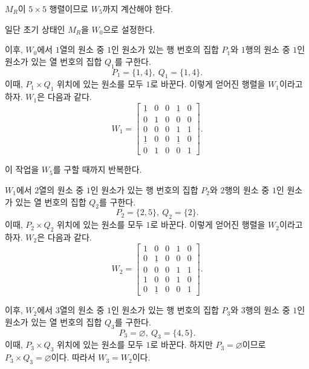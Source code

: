 \documentclass{oblivoir}
\begin{document}
$M_R$이 $5 \times 5$ 행렬이므로 $W_5$까지 계산해야 한다.

일단 초기 상태인 $M_R$을 $W_0$으로 설정한다.

이후, $W_0$에서 $1$열의 원소 중 $1$인 원소가 있는 행 번호의 집합 $P_1$와
$1$행의 원소 중 $1$인 원소가 있는 열 번호의 집합 $Q_1$를 구한다.
\begin{equation}
    P_1 = \{1, 4\},\ Q_1 = \{1, 4\}.
\end{equation}
이때, $P_1 \times Q_1$ 위치에 있는 원소를 모두 $1$로 바꾼다.
이렇게 얻어진 행렬을 $W_1$이라고 하자.
$W_1$은 다음과 같다.
\begin{equation}
    W_1 = \begin{bmatrix}
        \underline 1 & 0 & 0 & \underline 1 & 0 \\
        0 & 1 & 0 & 0 & 0 \\
        0 & 0 & 0 & 1 & 1 \\
        \underline 1 & 0 & 0 & \underline 1 & 0 \\
        0 & 1 & 0 & 0 & 1
    \end{bmatrix}.
\end{equation}

이 작업을 $W_5$를 구할 때까지 반복한다.

$W_1$에서 $2$열의 원소 중 $1$인 원소가 있는 행 번호의 집합 $P_2$와
$2$행의 원소 중 $1$인 원소가 있는 열 번호의 집합 $Q_2$를 구한다.
\begin{equation}
    P_2 = \{2, 5\},\ Q_2 = \{2\}.
\end{equation}
이때, $P_2 \times Q_2$ 위치에 있는 원소를 모두 $1$로 바꾼다.
이렇게 얻어진 행렬을 $W_2$이라고 하자.
$W_2$은 다음과 같다.
\begin{equation}
    W_2 = \begin{bmatrix}
        1 & 0 & 0 & 1 & 0 \\
        0 & \underline 1 & 0 & 0 & 0 \\
        0 & 0 & 0 & 1 & 1 \\
        1 & 0 & 0 & 1 & 0 \\
        0 & \underline 1 & 0 & 0 & 1
    \end{bmatrix}.
\end{equation}

이후, $W_2$에서 $3$열의 원소 중 $1$인 원소가 있는 행 번호의 집합 $P_3$와
$3$행의 원소 중 $1$인 원소가 있는 열 번호의 집합 $Q_3$를 구한다.
\begin{equation}
    P_3 = \varnothing,\ Q_3 = \{4,5\}.
\end{equation}
이때, $P_3 \times Q_3$ 위치에 있는 원소를 모두 $1$로 바꾼다.
하지만 $P_3 = \varnothing$이므로 $P_3 \times Q_3 = \varnothing$이다.
따라서 $W_3 = W_2$이다.
\end{document}
